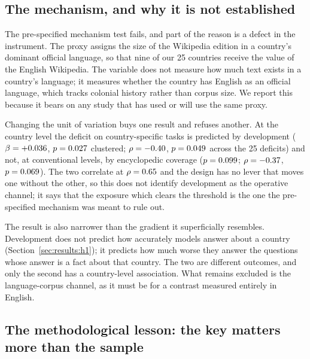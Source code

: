 \subsection{The mechanism, and why it is not established}

The pre-specified mechanism test fails, and part of the reason is a defect in
the instrument. The proxy assigns the size of the Wikipedia edition in a
country's dominant official language, so that nine of our 25 countries receive
the value of the English Wikipedia. The variable does not measure how much text
exists in a country's language; it measures whether the country has English as
an official language, which tracks colonial history rather than corpus size. We
report this because it bears on any study that has used or will use the same
proxy.

Changing the unit of variation buys one result and refuses another. At the
country level the deficit on country-specific tasks is predicted by development
($\beta=+0.036$, $p=0.027$ clustered;
$\rho=-0.40$, $p=0.049$ across the 25 deficits) and not,
at conventional levels, by encyclopedic coverage ($p=0.099$;
$\rho=-0.37$, $p=0.069$). The two correlate at
$\rho=0.65$ and the design has no lever that moves one without the
other, so this does not identify development as the operative channel; it says
that the exposure which clears the threshold is the one the pre-specified
mechanism was meant to rule out.

The result is also narrower than the gradient it superficially resembles.
Development does not predict how accurately models answer about a country
(Section~\ref{sec:results:h1}); it predicts how much worse they answer the
questions whose answer is a fact about that country. The two are different
outcomes, and only the second has a country-level association. What remains
excluded is the language-corpus channel, as it must be for a contrast measured
entirely in English.

\subsection{The methodological lesson: the key matters more than the sample}

